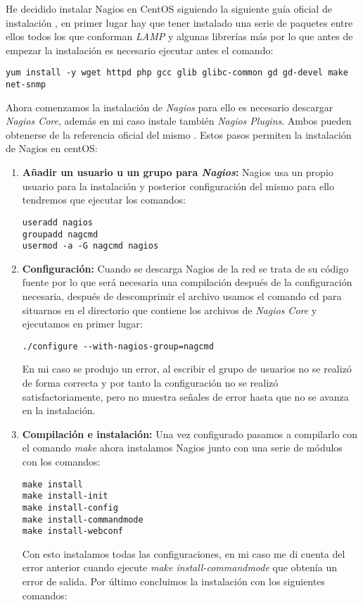 \documentclass[a4paper, 11pt]{article} %
\begin{document}
He decidido instalar Nagios en CentOS siguiendo la siguiente guía oficial de instalación \cite{14}, en primer lugar hay que tener instalado una serie de paquetes entre ellos todos los que conforman \textit{LAMP} y algunas librerías más por lo que antes de empezar la instalación es necesario ejecutar antes el comando:
\begin{verbatim}
yum install -y wget httpd php gcc glib glibc-common gd gd-devel make net-snmp
\end{verbatim}
Ahora comenzamos la instalación de \textit{Nagios} para ello es necesario descargar \textit{Nagios Core}, además en mi caso instale también \textit{Nagios Plugins}. Ambos pueden obtenerse de la referencia oficial del mismo \cite{15}.
Estos pasos permiten la instalación de Nagios en centOS:
\begin{enumerate}
\item \textbf{Añadir un usuario u un grupo para \textit{Nagios}:} Nagios usa un propio usuario para la instalación y posterior configuración del mismo para ello tendremos que ejecutar los comandos:
\begin{verbatim}
useradd nagios
groupadd nagcmd
usermod -a -G nagcmd nagios
\end{verbatim}
\item \textbf{Configuración:} Cuando se descarga Nagios de la red se trata de su código fuente por lo que será necesaria una compilación después de la configuración necesaria, después de descomprimir el archivo usamos el comando cd para situarnos en el directorio que contiene los archivos de \textit{Nagios Core} y ejecutamos en primer lugar:
\begin{verbatim}
./configure --with-nagios-group=nagcmd
\end{verbatim}
En mi caso se produjo un error, al escribir el grupo de usuarios no se realizó de forma correcta y por tanto la configuración no se realizó satisfactoriamente, pero no muestra señales de error hasta que no se avanza en la instalación.
\item \textbf{Compilación e instalación:} Una vez configurado pasamos a compilarlo con el comando \textit{make} ahora instalamos Nagios junto con una serie de módulos con los comandos:
\begin{verbatim}
make install
make install-init
make install-config
make install-commandmode
make install-webconf
\end{verbatim}
Con esto instalamos todas las configuraciones, en mi caso me di cuenta del error anterior cuando ejecute \textit{make install-commandmode} que obtenía un error de salida. Por último concluimos la instalación con los siguientes comandos:

\end{enumerate}
\end{document}
